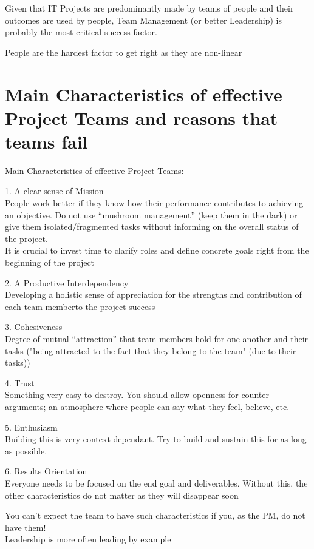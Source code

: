 \documentclass[]{project_plan}
\begin{document}
Given that IT Projects are predominantly made by teams of people and their outcomes
are used by people, Team Management (or better Leadership) is probably the most
critical success factor.

People are the hardest factor to get right as they are non-linear

\section{Main Characteristics of effective Project Teams and reasons that teams fail}

\underline{Main Characteristics of effective Project Teams:}

1. A clear sense of Mission\\
People work better if they know how their performance contributes to achieving an objective. Do not use
“mushroom management” (keep them in the dark) or give them isolated/fragmented tasks without
informing on the overall status of the project.\\
It is crucial to invest time to clarify roles and define concrete goals right from the beginning of the project

2. A Productive Interdependency\\
Developing a holistic sense of appreciation for the strengths and contribution of each team
memberto the project success

3. Cohesiveness\\
Degree of mutual “attraction” that team members hold for one another and
their tasks ("being attracted to the fact that they belong to the team"
(due to their tasks))

4. Trust\\
Something very easy to destroy. You should allow openness for counter-arguments;
an atmosphere where people can say what they feel, believe, etc.

5. Enthusiasm\\
Building this is very context-dependant. Try to build and sustain this for as
long as possible.

6. Results Orientation\\
Everyone needs to be focused on the end goal and deliverables. Without this,
the other characteristics do not matter as they will disappear soon

You can’t expect the team to have such characteristics if you, as the PM, do not have them!\\
Leadership is more often leading by example
\end{document}
